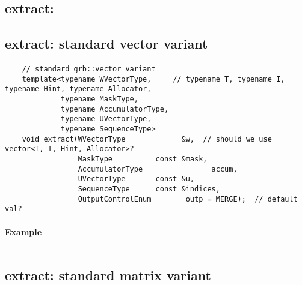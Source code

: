 \subsection{{\sf extract}: }

\subsection{{\sf extract}: standard vector variant}

\paragraph{\syntax}

\begin{verbatim}
    // standard grb::vector variant
    template<typename WVectorType,     // typename T, typename I, typename Hint, typename Allocator,
             typename MaskType,
             typename AccumulatorType,
             typename UVectorType,
             typename SequenceType>
    void extract(WVectorType             &w,  // should we use vector<T, I, Hint, Allocator>?
                 MaskType          const &mask,
                 AccumulatorType                accum,
                 UVectorType       const &u,
                 SequenceType      const &indices,
                 OutputControlEnum        outp = MERGE);  // default val?
\end{verbatim}


\paragraph{Example}

\begin{verbatim}

\end{verbatim}

\subsection{{\sf extract}: standard matrix variant}

\paragraph{\syntax}

